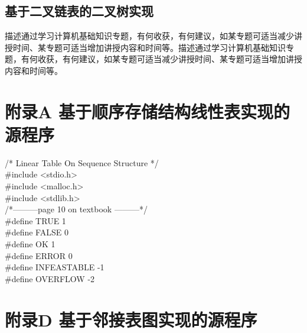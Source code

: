 \documentclass[supercite]{Experimental_Report}
\theoremstyle{definition}
\begin{document}
\subsection{基于二叉链表的二叉树实现}

描述通过学习计算机基础知识专题，有何收获，有何建议，如某专题可适当减少讲授时间、某专题可适当增加讲授内容和时间等。描述通过学习计算机基础知识专题，有何收获，有何建议，如某专题可适当减少讲授时间、某专题可适当增加讲授内容和时间等。


\nocite{*} %



\setcounter{secnumdepth}{0}
\appendix

\section{附录A 基于顺序存储结构线性表实现的源程序}

\noindent
/* Linear Table On Sequence Structure */\\
\#include <stdio.h>\\
\#include <malloc.h>\\
\#include <stdlib.h>\\

\noindent
/*---------page 10 on textbook ---------*/\\
\#define TRUE 1\\
\#define FALSE 0\\
\#define OK 1\\
\#define ERROR 0\\
\#define INFEASTABLE -1\\
\#define OVERFLOW -2\\
\newpage
\section{附录D 基于邻接表图实现的源程序}
\end{document}
